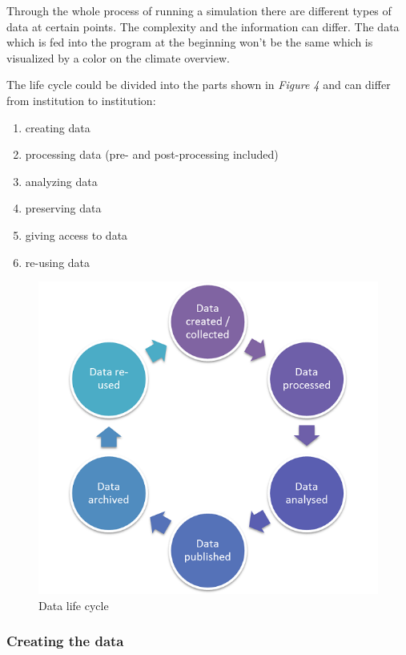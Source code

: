 \documentclass[]{article}
\providecommand{\tightlist}{%
  \setlength{\itemsep}{0pt}\setlength{\parskip}{0pt}}
\begin{document}
Through the whole process of running a simulation there are different
types of data at certain points. The complexity and the information can
differ. The data which is fed into the program at the beginning won't be
the same which is visualized by a color on the climate overview.
\cite{lanuni}

The life cycle could be divided into the parts shown in \emph{Figure 4}
\cite{lanuni2} and can differ from institution to institution:

\begin{enumerate}
\def\labelenumi{\arabic{enumi}.}
\tightlist
\item
  creating data
\item
  processing data (pre- and post-processing included)
\item
  analyzing data
\item
  preserving data
\item
  giving access to data
\item
  re-using data
\end{enumerate}

\begin{figure}
\centering
\includegraphics{pics/DataLifecycle.png}
\caption{Data life cycle}
\end{figure}

\subsubsection{Creating the data}\label{creating-the-data}
\end{document}
